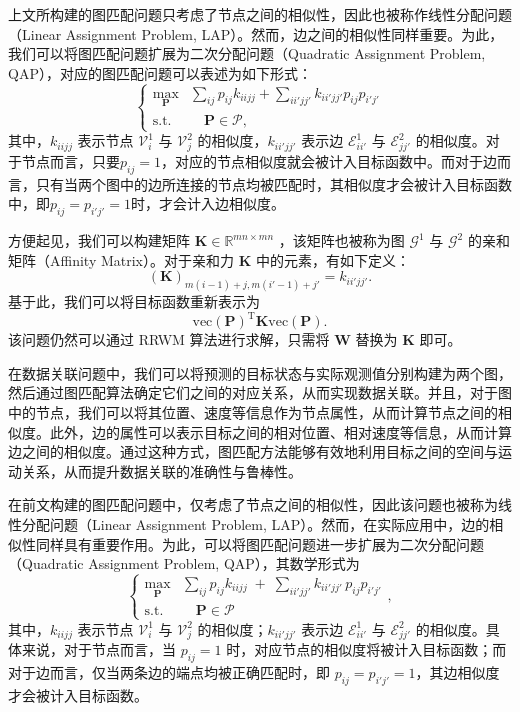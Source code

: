 上文所构建的图匹配问题只考虑了节点之间的相似性，因此也被称作线性分配问题（Linear Assignment Problem, LAP）。然而，边之间的相似性同样重要。为此，我们可以将图匹配问题扩展为二次分配问题（Quadratic Assignment Problem, QAP），对应的图匹配问题可以表述为如下形式：
\[
    \begin{cases}
        \max_{\mathbf P} & \sum_{i j} p_{i j} k_{i i j j} + \sum_{i i' j j'} k_{i i' j j'} p_{i j} p_{i' j'} \\
        \text{s.t.}      & \quad \mathbf P \in \mathcal P ,
    \end{cases}
\]
其中，$k_{i i j j}$ 表示节点 $\mathcal V_i^{1}$ 与 $\mathcal V_j^{2}$ 的相似度，$k_{i i' j j'}$ 表示边 $\mathcal E_{i i'}^{1}$ 与 $\mathcal E_{j j'}^{2}$ 的相似度。对于节点而言，只要\( p_{ij} = 1 \)，对应的节点相似度就会被计入目标函数中。而对于边而言，只有当两个图中的边所连接的节点均被匹配时，其相似度才会被计入目标函数中，即\( p_{ij} = p_{i'j'} = 1 \)时，才会计入边相似度。

方便起见，我们可以构建矩阵 $\mathbf K \in \mathbb R^{m n \times m n}$ ，该矩阵也被称为图 $\mathcal G^{1}$ 与 $\mathcal G^{2}$ 的亲和矩阵（Affinity Matrix）。对于亲和力 $\mathbf K$ 中的元素，有如下定义：
\[
    (\mathbf{K})_{m(i-1)+j, m(i'-1)+j'} = k_{i i' j j'}.
\]
基于此，我们可以将目标函数重新表示为
\[
    \mathrm{vec}(\mathbf{P})^{\mathrm{T}} \mathbf{K} \mathrm{vec}(\mathbf{P}).
\]
该问题仍然可以通过 RRWM 算法进行求解，只需将 $\mathbf W$ 替换为 $\mathbf K$ 即可。

在数据关联问题中，我们可以将预测的目标状态与实际观测值分别构建为两个图，然后通过图匹配算法确定它们之间的对应关系，从而实现数据关联。并且，对于图中的节点，我们可以将其位置、速度等信息作为节点属性，从而计算节点之间的相似度。此外，边的属性可以表示目标之间的相对位置、相对速度等信息，从而计算边之间的相似度。通过这种方式，图匹配方法能够有效地利用目标之间的空间与运动关系，从而提升数据关联的准确性与鲁棒性。

在前文构建的图匹配问题中，仅考虑了节点之间的相似性，因此该问题也被称为线性分配问题（Linear Assignment Problem, LAP）。然而，在实际应用中，边的相似性同样具有重要作用。为此，可以将图匹配问题进一步扩展为二次分配问题（Quadratic Assignment Problem, QAP），其数学形式为
\[
    \begin{cases}
        \max_{\mathbf P} & \sum_{ij} p_{ij} k_{i i j j} \;+\; \sum_{ii'jj'} k_{i i' j j'} \, p_{ij} p_{i'j'} \\
        \text{s.t.}      & \quad \mathbf P \in \mathcal P
    \end{cases},
\]
其中，$k_{i i j j}$ 表示节点 $\mathcal V_i^{1}$ 与 $\mathcal V_j^{2}$ 的相似度；$k_{i i' j j'}$ 表示边 $\mathcal E_{ii'}^{1}$ 与 $\mathcal E_{jj'}^{2}$ 的相似度。具体来说，对于节点而言，当 $p_{ij} = 1$ 时，对应节点的相似度将被计入目标函数；而对于边而言，仅当两条边的端点均被正确匹配时，即 $p_{ij} = p_{i'j'} = 1$，其边相似度才会被计入目标函数。

